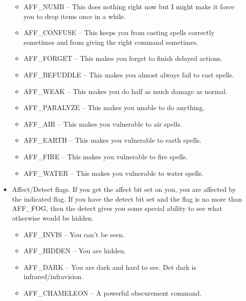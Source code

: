 \begin{itemize}
\begin{itemize}
\item AFF\_NUMB -- This does nothing right now but I might make it force you to drop items once in a while.

\item AFF\_CONFUSE -- This keeps you from casting spells correctly sometimes and from giving the right command sometimes.

\item AFF\_FORGET -- This makes you forget to finish delayed actions.

\item AFF\_BEFUDDLE -- This makes you almost always fail to cast spells.

\item AFF\_WEAK -- This makes you do half as much damage as normal.

\item AFF\_PARALYZE -- This makes you unable to do anything.

\item AFF\_AIR -- This makes you vulnerable to air spells.

\item AFF\_EARTH -- This makes you vulnerable to earth spells.

\item AFF\_FIRE -- This makes you vulnerable to fire spells.

\item AFF\_WATER -- This makes you vulnerable to water spells.

\end{itemize}


\item Affect/Detect flags. If you get the affect bit set on you, you are affected by the indicated flag. If you have the detect bit set and the flag is no more than AFF\_FOG, then the detect gives you some special ability to see what otherwise would be hidden.

\begin{itemize}

\item AFF\_INVIS -- You can't be seen.

\item AFF\_HIDDEN -- You are hidden.

\item AFF\_DARK -- You are dark and hard to see. Det dark is infrared/infravision.

\item AFF\_CHAMELEON -- A powerful obscurement command.


\end{itemize}
\end{itemize}
